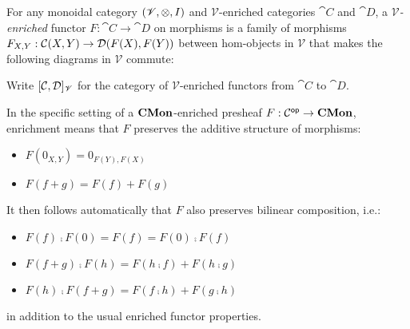 \begin{definition}
For any monoidal category $(\mathscr{V}, \otimes, I)$ and $\mathscr{V}$-enriched categories $\cat{C}$ and
$\cat{D}$, a \emph{$\mathscr{V}$-enriched} functor $F: \cat{C} \to \cat{D}$ on morphisms is a family of
morphisms $F_{X,Y}: {\mathcal{C}}(X,Y) \to {\mathcal{D}}(F(X),F(Y))$ between hom-objects in $\mathscr{V}$
that makes the following diagrams in $\mathscr{V}$ commute:

\begin{center}
\hspace{5mm}
\end{center}
\end{definition}

\begin{definition}
Write $[\mathcal{C},\mathcal{D}]_{\mathscr{V}}$ for the category of $\mathscr{V}$-enriched functors from
$\cat{C}$ to $\cat{D}$.
\end{definition}

In the specific setting of a $\mathbf{CMon}$-enriched presheaf $F: \mathcal{C}^{\mathsf{op}} \to \mathbf{CMon}$, enrichment means that $F$
preserves the additive structure of morphisms:
\begin{itemize}
\item $F(0_{X,Y}) = 0_{F(Y),F(X)}$
\item $F(f + g) = F(f) + F(g)$
\end{itemize}
It then follows automatically that $F$ also preserves bilinear composition, i.e.:
\begin{itemize}
\item $F(f) \comp F(0) = F(f) = F(0) \comp F(f)$
\item $F(f + g) \comp F(h) = F(h \comp f) + F(h \comp g)$
\item $F(h) \comp F(f + g) = F(f \comp h) + F(g \comp h)$
\end{itemize}
in addition to the usual enriched functor properties.

